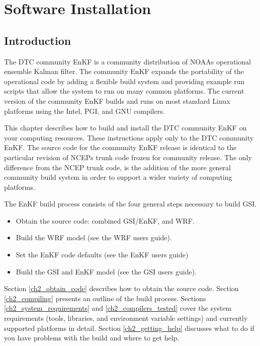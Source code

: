 \chapter{Software Installation}
\setlength{\parskip}{12pt}

\section{Introduction}

The DTC community EnKF is a community distribution of NOAA\textquotesingle s operational ensemble Kalman filter. The community EnKF expands the portability of the operational code by adding a flexible build system and providing example run scripts that allow the system to run on many common platforms. The current version of the community EnKF builds and runs on most standard Linux platforms using the Intel, PGI, and GNU compilers.

This chapter describes how to build and install the DTC community EnKF on your computing resources. These instructions apply only to the DTC community EnKF. The source code for the community EnKF release is identical to the particular revision of NCEP\textquotesingle s trunk code frozen for community release. The only difference from the NCEP trunk code, is the addition of the more general community build system in order to support a wider variety of computing platforms.

The EnKF build process consists of the four general steps necessary to build GSI. 
\begin{itemize}
\item Obtain the source code: combined GSI/EnKF, and WRF.
\item Build the WRF model (see the WRF users guide).
\item Set the EnKF code defaults (see the EnKF users guide)
\item Build the GSI and EnKF model (see the GSI users guide).
\end{itemize}

Section \ref{ch2_obtain_code} describes how to obtain the source code. Section \ref{ch2_compiling} presents an outline of the build process. Sections \ref{ch2_system_requirements} and \ref{ch2_compilers_tested} cover the system requirements (tools, libraries, and environment variable settings) and currently supported platforms in detail. Section \ref{ch2_getting_help} discusses what to do if you have problems with the build and where to get help.

